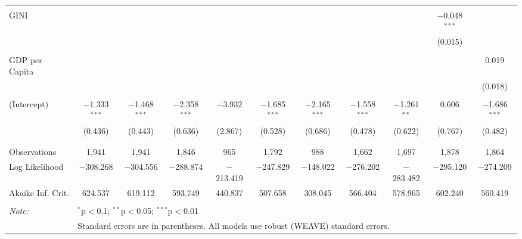 \documentclass[a4paper]{article}\usepackage[]{graphicx}\usepackage[]{color}
\begin{document}
\begin{table}
\begin{center}
{{\begin{tabular}{@{\extracolsep{5pt}}lcccccccccc}
  & & & & & & & & & & \\ 
 GINI &  &  &  &  &  &  &  &  & $-$0.048$^{***}$ &  \\ 
  &  &  &  &  &  &  &  &  & (0.015) &  \\ 
  & & & & & & & & & & \\ 
 GDP per Capita &  &  &  &  &  &  &  &  &  & 0.019 \\ 
  &  &  &  &  &  &  &  &  &  & (0.018) \\ 
  & & & & & & & & & & \\ 
 (Intercept) & $-$1.333$^{***}$ & $-$1.468$^{***}$ & $-$2.358$^{***}$ & $-$3.932 & $-$1.685$^{***}$ & $-$2.165$^{***}$ & $-$1.558$^{***}$ & $-$1.261$^{**}$ & 0.606 & $-$1.686$^{***}$ \\ 
  & (0.436) & (0.443) & (0.636) & (2.867) & (0.528) & (0.686) & (0.478) & (0.622) & (0.767) & (0.482) \\ 
  & & & & & & & & & & \\ 
\hline \\[-1.8ex] 
Observations & 1,941 & 1,941 & 1,846 & 965 & 1,792 & 988 & 1,662 & 1,697 & 1,878 & 1,864 \\ 
Log Likelihood & $-$308.268 & $-$304.556 & $-$288.874 & $-$213.419 & $-$247.829 & $-$148.022 & $-$276.202 & $-$283.482 & $-$295.120 & $-$274.209 \\ 
Akaike Inf. Crit. & 624.537 & 619.112 & 593.749 & 440.837 & 507.658 & 308.045 & 566.404 & 578.965 & 602.240 & 560.419 \\ 
\hline 
\hline \\[-1.8ex] 
\textit{Note:}  & \multicolumn{10}{l}{$^{*}$p$<$0.1; $^{**}$p$<$0.05; $^{***}$p$<$0.01} \\ 
 & \multicolumn{10}{l}{Standard errors are in parentheses. All models use robust (WEAVE) standard errors.} \\ 
\end{tabular} 

}}
\end{center}

\end{table}
\end{document}
